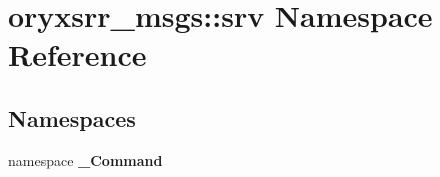 \section{oryxsrr\-\_\-msgs\-:\-:srv \-Namespace \-Reference}
\label{namespaceoryxsrr__msgs_1_1srv}
\subsection*{\-Namespaces}
\begin{DoxyCompactItemize}
\item 
namespace {\bf \-\_\-\-Command}
\end{DoxyCompactItemize}
